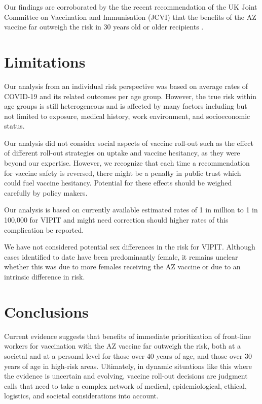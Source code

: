 \documentclass[]{interact}
\theoremstyle{plain}%
\theoremstyle{definition}
\theoremstyle{remark}
\begin{document}
Our findings are corroborated by the the recent recommendation of the UK
Joint Committee on Vaccination and Immunisation (JCVI) that the benefits
of the AZ vaccine far outweigh the risk in 30 years old or older
recipients \citep{jcvi_jcvi_2021}.

\hypertarget{limitations}{%
\section{Limitations}\label{limitations}}

Our analysis from an individual risk perspective was based on average
rates of COVID-19 and its related outcomes per age group. However, the
true risk within age groups is still heterogeneous and is affected by
many factors including but not limited to exposure, medical history,
work environment, and socioeconomic status.

Our analysis did not consider social aspects of vaccine roll-out such as
the effect of different roll-out strategies on uptake and vaccine
hesitancy, as they were beyond our expertise. However, we recognize that
each time a recommendation for vaccine safety is reversed, there might
be a penalty in public trust which could fuel vaccine hesitancy.
Potential for these effects should be weighed carefully by policy
makers.

Our analysis is based on currently available estimated rates of 1 in
million to 1 in 100,000 for VIPIT and might need correction should
higher rates of this complication be reported.

We have not considered potential sex differences in the risk for VIPIT.
Although cases identified to date have been predominantly female, it
remains unclear whether this was due to more females receiving the AZ
vaccine or due to an intrinsic difference in risk.

\hypertarget{conclusions}{%
\section{Conclusions}\label{conclusions}}

Current evidence suggests that benefits of immediate prioritization of
front-line workers for vaccination with the AZ vaccine far outweigh the
risk, both at a societal and at a personal level for those over 40 years
of age, and those over 30 years of age in high-risk areas. Ultimately,
in dynamic situations like this where the evidence is uncertain and
evolving, vaccine roll-out decisions are judgment calls that need to
take a complex network of medical, epidemiological, ethical, logistics,
and societal considerations into account.



\end{document}
